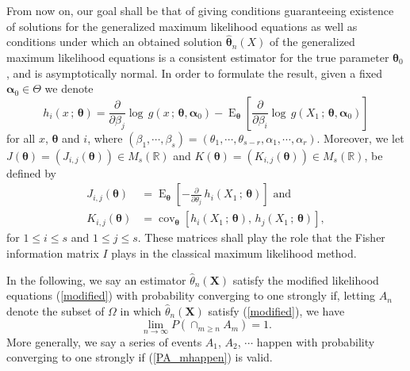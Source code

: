 \documentclass[lineno]{biometrika}
\newcommand{\bs}{\boldsymbol}
\newcommand{\on}{\operatorname}
\begin{document}
From now on, our goal shall be that of giving conditions guaranteeing existence of solutions for the generalized maximum likelihood equations as well as conditions under which an obtained solution $\bs{\hat{\theta}}_n(X)$ of the generalized maximum likelihood equations is a consistent estimator for the true parameter $\bs{\theta}_0$, and is asymptotically normal. In order to formulate the result, given a fixed $\bs{\alpha}_0\in \Theta$ we denote
\begin{equation}\label{defh}
h_i(x\,;\,\bs{\theta}) = \frac{\partial}{\partial \beta_j}\log\, g \left(x\,;\,\bs{\theta},\bs{\alpha}_0\right) - \on{E}_{\bs{\theta}}\left[\frac{\partial}{\partial \beta_i}\log\, g \left(X_1\,;\,\bs{\theta},\bs{\alpha}_0\right)\right]
\end{equation}
for all $x$, $\bs{\theta}$ and $i$, where $(\beta_1,\cdots,\beta_s)=(\theta_1,\cdots,\theta_{s-r},\alpha_1,\cdots,\alpha_r)$. Moreover, we let $J(\bs{\theta})=\left(J_{i,j}(\bs{\theta})\right)\in M_{s}(\mathbb{R})$ and $K(\bs{\theta})=\left(K_{i,j}(\bs{\theta})\right)\in M_{s}(\mathbb{R})$, be defined by
 \begin{equation}\label{eqj}
 \begin{aligned}J_{i,j}(\bs{\theta})&=
 \on{E}_{\bs{\theta}} \left[-\frac{\partial}{\partial\theta_j}\, h_i(X_1\, ;\, \bs{\theta})\right]\mbox{ and}\\
 K_{i,j}(\bs{\theta}) &=  \on{cov}_{\bs{\theta}} \left[h_i(X_1\, ;\, \bs{\theta}),\,  h_j(X_1\, ;\, \bs{\theta})\right],
 \end{aligned}
 \end{equation}
 for $1\leq i\leq s$ and $1\leq j\leq s$. These matrices shall play the role that the Fisher information matrix $I$ plays in the classical maximum likelihood method.


In the following, we say an estimator $\hat{\theta}_n(\bs{X})$ satisfy the modified likelihood equations (\ref{modified}) with probability converging to one strongly if, letting $A_n$ denote the subset of $\Omega$ in which $\hat{\theta}_n(\bs{X})$ satisfy (\ref{modified}), we have
\begin{equation}\label{PA_mhappen} \lim_{n\to \infty} P(\cap_{m\geq n} A_m) = 1.
\end{equation}
More generally, we say 
a series of events $A_1$, $A_2$, $\cdots$ happen with probability converging to one strongly if (\ref{PA_mhappen}) is valid.
\end{document}
